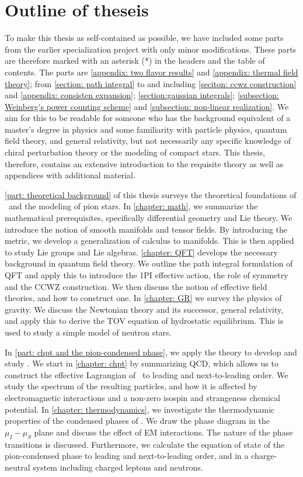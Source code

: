 \section{Outline of theseis}

To make this thesis as self-contained as possible, we have included some parts from the earlier specialization project with only minor modifications.
These parts are therefore marked with an asterisk (*) in the headers and the table of contents.
The parts are \autoref{appendix: two flavor results} and \autoref{appendix: thermal field theory}; from \autoref{section: path integral} to and including \autoref{seciton: ccwz construction} and \autoref{appendix: consisten expansion}; \autoref{section:gaussian integrals}; \autoref{subsection: Weinberg's power counting scheme} and \autoref{subsection: non-linear realization}.
We aim for this to be readable for someone who has the background equivalent of a master's degree in physics and some familiarity with particle physics, quantum field theory, and general relativity, but not necessarily any specific knowledge of chiral perturbation theory or the modeling of compact stars.
This thesis, therefore, contains an extensive introduction to the requisite theory as well as appendices with additional material.

\autoref{part: theoretical background} of this thesis surveys the theoretical foundations of \chpt\, and the modeling of pion stars.
In \autoref{chapter: math}, we summarize the mathematical prerequisites, specifically differential geometry and Lie theory.
We introduce the notion of smooth manifolds and tensor fields.
By introducing the metric, we develop a generalization of calculus to manifolds.
This is then applied to study Lie groups and Lie algebras.
\autoref{chapter: QFT} develops the necessary background in quantum field theory.
We outline the path integral formulation of QFT and apply this to introduce the 1PI effective action, the role of symmetry and the CCWZ construction.
We then discuss the notion of effective field theories, and how to construct one.
In \autoref{chapter: GR} we survey the physics of gravity.
We discuss the Newtonian theory and its successor, general relativity, and apply this to derive the TOV equation of hydrostatic equilibrium.
This is used to study a simple model of neutron stars.

In \autoref{part: chpt and the pion-condensed phase}, we apply the theory to develop and study \chpt.
We start in \autoref{chapter: chpt} by summarizing QCD, which allows us to construct the effective Lagrangian of \chpt\, to leading and next-to-leading order.
We study the spectrum of the resulting particles, and how it is affected by electromagnetic interactions and a non-zero isospin and strangeness chemical potential.
In \autoref{chapter: thermodynamics}, we investigate the thermodynamic properties of the condensed phases of \chpt.
We draw the phase diagram in the $\mu_I-\mu_S$ plane and discuss the effect of EM interactions.
The nature of the phase transitions is discussed.
Furthermore, we calculate the equation of state of the pion-condensed phase to leading and next-to-leading order, and in a charge-neutral system including charged leptons and neutrons.


